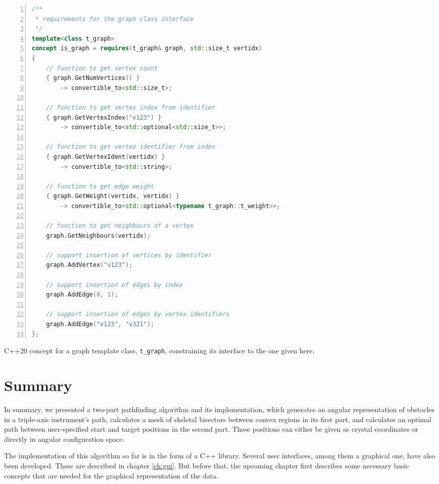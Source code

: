\begin{listing}[htb]
	\begin{lstlisting}[language = C++,
			basicstyle = {\scriptsize},
			breaklines = true, tabsize = 4,
			numbers = left, numberstyle={\scriptsize}]
/**
 * requirements for the graph class interface
 */
template<class t_graph>
concept is_graph = requires(t_graph& graph, std::size_t vertidx)
{
	// function to get vertex count
	{ graph.GetNumVertices() }
		-> convertible_to<std::size_t>;

	// function to get vertex index from identifier
	{ graph.GetVertexIndex("v123") }
		-> convertible_to<std::optional<std::size_t>>;

	// function to get vertex identifier from index
	{ graph.GetVertexIdent(vertidx) }
		-> convertible_to<std::string>;

	// function to get edge weight
	{ graph.GetWeight(vertidx, vertidx) }
		-> convertible_to<std::optional<typename t_graph::t_weight>>;

	// function to get neighbours of a vertex
	graph.GetNeighbours(vertidx);

	// support insertion of vertices by identifier
	graph.AddVertex("v123");

	// support insertion of edges by index
	graph.AddEdge(0, 1);

	// support insertion of edges by vertex identifiers
	graph.AddEdge("v123", "v321");
};
	\end{lstlisting}
	\caption[C++ graph template concept.]{
	C++20 concept for a graph template class, \lstinline[language=C++]|t_graph|,
	constraining its interface to the one given here.
	\label{lst:graph_concept}}
\end{listing}



\section{Summary}
In summary, we presented a two-part pathfinding algorithm and its implementation, which generates an angular
representation of obstacles in a triple-axis instrument's path, calculates a mesh of skeletal bisectors between 
convex regions in its first part, and calculates an optimal path between user-specified start and target positions
in the second part. These positions can either be given as crystal coordinates or directly in angular configuration space.

The implementation of this algorithm so far is in the form of a C++ library. Several user interfaces, among them a
graphical one, have also been developed. These are described in chapter \ref{ch:gui}.
But before that, the upcoming chapter first describes some necessary basic concepts that are needed for the 
graphical representation of the data.

